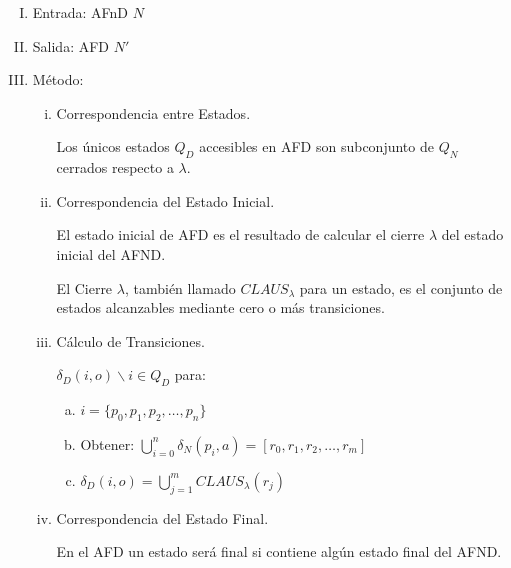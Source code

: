 \begin{enumerate}[I.]

\item Entrada: AFnD $N$

\item Salida: AFD $N\prime$

\item Método:
{
\begin{enumerate}[i.]
\item Correspondencia entre Estados.

{ Los \'unicos estados $Q_{D}$ accesibles en AFD son subconjunto de $Q_{N}$
cerrados respecto a $\lambda$.}

\item Correspondencia del Estado Inicial.

{ El estado inicial de AFD es el resultado de calcular el cierre $\lambda$
del estado inicial del AFND.}

{\cor El Cierre $\lambda$, también llamado $CLAUS_\lambda$ para un estado, es el conjunto de estados alcanzables mediante cero o más transiciones.}

\item Cálculo de Transiciones.
{

\form $\delta_{D} (i,o) \backslash i \in Q_{D}$ para:

\begin{enumerate}[a.]
\item $i = \{p_{0}, p_{1}, p_{2}, \ldots, p_{n} \}$
\item Obtener: $\bigcup\limits^{n}_{i=0} \delta_{N}(p_{i},a) = [r_{0}, r_{1},
r_{2}, \ldots, r_{m} ]$
\item $\delta_{D} (i,o) = \bigcup\limits^{m}_{j=1}   CLAUS_{\lambda}(r_{j})$
\end{enumerate}
}

\item Correspondencia del Estado Final.

{ En el AFD un estado ser\'a final si contiene alg\'un estado final del
AFND.}

\end{enumerate}
}
\end{enumerate}

